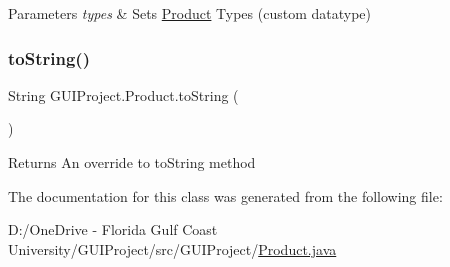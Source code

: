 \begin{DoxyParams}{Parameters}
{\em types} & Sets \mbox{\hyperlink{class_g_u_i_project_1_1_product}{Product}} Types (custom datatype) \\
\hline
\end{DoxyParams}
\mbox{\label{class_g_u_i_project_1_1_product_ac37c87e9eceda7b1453bbe59b1e20c75}} 
\subsubsection{\texorpdfstring{toString()}{toString()}}
{\footnotesize\ttfamily String G\+U\+I\+Project.\+Product.\+to\+String (\begin{DoxyParamCaption}{ }\end{DoxyParamCaption})}

\begin{DoxyReturn}{Returns}
An override to to\+String method 
\end{DoxyReturn}


The documentation for this class was generated from the following file\+:\begin{DoxyCompactItemize}
\item 
D\+:/\+One\+Drive -\/ Florida Gulf Coast University/\+G\+U\+I\+Project/src/\+G\+U\+I\+Project/\mbox{\hyperlink{_product_8java}{Product.\+java}}\end{DoxyCompactItemize}
